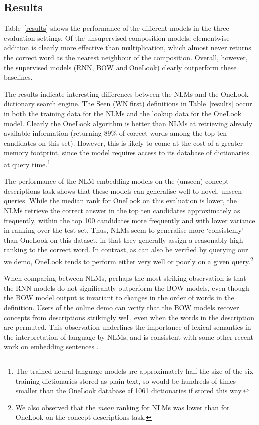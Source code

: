 \subsection{Results}


Table~\ref{results} shows the performance of the different models in the three evaluation settings. Of the unsupervised composition models, elementwise addition is clearly more effective than multiplication, which almost never returns the correct word as the nearest neighbour of the composition. Overall, however, the supervised models (RNN, BOW and OneLook) clearly outperform these baselines. 

The results indicate interesting differences between the NLMs and the OneLook dictionary search engine. The Seen (WN first) definitions in Table~\ref{results} occur in both the training data for the NLMs and the lookup data for the OneLook model. Clearly the OneLook algorithm is better than NLMs at retrieving already available information (returning 89\% of  correct words among the top-ten candidates on this set). However, this is likely to come at the cost of a greater memory footprint, since the model requires access to its database of dictionaries at query time.\footnote{The trained neural language models are approximately half the size of the six training dictionaries stored as plain text, so would be hundreds of times smaller than the OneLook database of 1061 dictionaries if stored this way.}

The performance of the NLM embedding models on the (unseen) concept descriptions task shows that these models can generalise well to novel, unseen queries. While the median rank for OneLook on this evaluation is lower, the NLMs retrieve the correct answer in the top ten candidates approximately as frequently, within the top 100 candidates more frequently and with lower variance in ranking over the test set. Thus, NLMs seem to generalise more `consistenly' than OneLook on this dataset, in that they generally assign a reasonably high ranking to the correct word. In contrast, as can also be verified by querying our we demo, OneLook tends to perform either very well or poorly on a given query.\footnote{We also observed that the \emph{mean} ranking for NLMs was lower than for OneLook on the concept descriptions task.}

When comparing between NLMs, perhaps the most striking observation is that the RNN models do not significantly outperform the BOW models, even though the BOW model output is invariant to changes in the order of words in the definition. Users of the online demo can verify that the BOW models recover concepts from descriptions strikingly well, even when the words in the description are permuted. This observation underlines the importance of lexical semantics in the interpretation of language by NLMs, and is consistent with some other recent work on embedding sentences \cite{iyyer2015deep}.    

